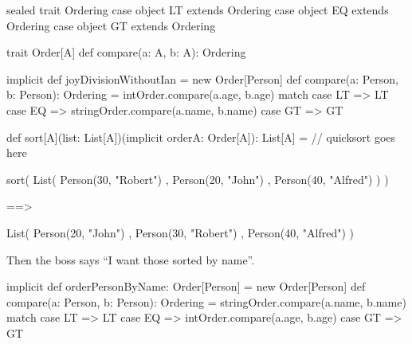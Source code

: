 \documentclass[usenames,dvipsnames,svgnames,table,aspectratio=169,mathserif]{beamer}
\newcommand{\nl}{\vspace{\baselineskip}}
\newcommand{\pnl}{\pause \nl}
\begin{document}
\begin{frame}[fragile]
\begin{scalacode}
sealed trait Ordering
case object LT extends Ordering
case object EQ extends Ordering
case object GT extends Ordering
\end{scalacode}

\pnl

\begin{scalacode}
trait Order[A] {
  def compare(a: A, b: A): Ordering
}
\end{scalacode}

\pnl

\begin{scalacode}
implicit def joyDivisionWithoutIan = new Order[Person] {
  def compare(a: Person, b: Person): Ordering =
    intOrder.compare(a.age, b.age) match {
      case LT => LT
      case EQ => stringOrder.compare(a.name, b.name)
      case GT => GT
    }
}
\end{scalacode}
\end{frame}


\begin{frame}[fragile]
\begin{scalacode}
def sort[A](list: List[A])(implicit orderA: Order[A]): List[A] = {
  // quicksort goes here
}
\end{scalacode}
\end{frame}


\begin{frame}[fragile]
\begin{scalacode}
sort(
  List(
    Person(30, "Robert")
  , Person(20, "John")
  , Person(40, "Alfred")
  )
)
\end{scalacode}

\pnl

\begin{scalacode}
==>

List(
  Person(20, "John")
, Person(30, "Robert")
, Person(40, "Alfred")
)
\end{scalacode}
\end{frame}


\begin{frame}[fragile]
Then the boss says ``I want those sorted by name''.

\pnl

\begin{scalacode}
implicit def orderPersonByName: Order[Person] = new Order[Person] {
  def compare(a: Person, b: Person): Ordering =
    stringOrder.compare(a.name, b.name) match {
      case LT => LT
      case EQ => intOrder.compare(a.age, b.age)
      case GT => GT
    }
}
\end{scalacode}


\end{frame}
\end{document}
